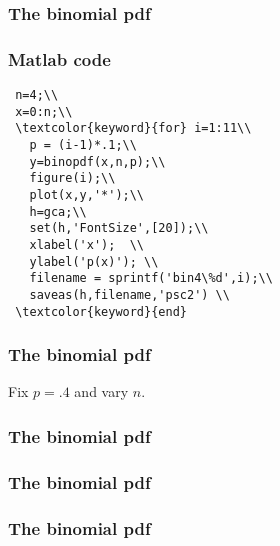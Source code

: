 \begin{frame}[fragile]\frametitle{The binomial pdf}


\end{frame}


\begin{frame}[fragile]\frametitle{Matlab code}

{\tiny

\begin{lstlisting}
 n=4;\\
 x=0:n;\\
 \textcolor{keyword}{for} i=1:11\\
   p = (i-1)*.1;\\
   y=binopdf(x,n,p);\\
   figure(i);\\
   plot(x,y,'*');\\
   h=gca;\\
   set(h,'FontSize',[20]);\\
   xlabel('x');  \\
   ylabel('p(x)'); \\
   filename = sprintf('bin4\%d',i);\\
   saveas(h,filename,'psc2') \\
 \textcolor{keyword}{end}
\end{lstlisting}
}
\end{frame}



\begin{frame}[fragile]\frametitle{The binomial pdf}

Fix $p=.4$ and vary $n$. 

\end{frame}




\begin{frame}[fragile]\frametitle{The binomial pdf}


\end{frame}

\begin{frame}[fragile]\frametitle{The binomial pdf}


\end{frame}

\begin{frame}[fragile]\frametitle{The binomial pdf}


\end{frame}


